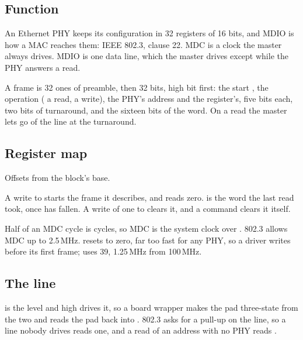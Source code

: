 
%
{}

\subsection*{Function}

An Ethernet PHY keeps its configuration in 32 registers of 16 bits,
and MDIO is how a MAC reaches them: IEEE 802.3, clause 22. MDC is a
clock the master always drives. MDIO is one data line, which the
master drives except while the PHY answers a read.

A frame is 32 ones of preamble, then 32 bits, high bit first: the
start , the operation ( a read,  a write),
the PHY's address and the register's, five bits each, two bits of
turnaround, and the sixteen bits of the word. On a read the master
lets go of the line at the turnaround.

\subsection*{Register map}

Offsets from the block's base.


A write to  starts the frame it describes, and 
reads zero.  is the word the last read took, once
 has fallen. A write of one to  clears it, and
a command clears it itself.

Half of an MDC cycle is  cycles, so MDC is the system
clock over . 802.3 allows MDC up to 2.5\,MHz.
 resets to zero, far too fast for any PHY, so a driver
writes  before its first frame;  uses 39,
1.25\,MHz from 100\,MHz.


\subsection*{The line}

 is the level and  high drives it, so
a board wrapper makes the pad three-state from the two and reads the
pad back into . 802.3 asks for a pull-up on the line,
so a line nobody drives reads one, and a read of an address with no
PHY reads .

